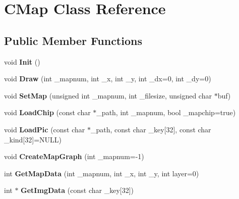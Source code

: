 \hypertarget{class_c_map}{}\section{C\+Map Class Reference}
\label{class_c_map}
\subsection*{Public Member Functions}
\begin{DoxyCompactItemize}
\item 
void {\bfseries Init} ()\hypertarget{class_c_map_a604f597cf8d0f5a5428bceba203f8550}{}\label{class_c_map_a604f597cf8d0f5a5428bceba203f8550}

\item 
void {\bfseries Draw} (int \+\_\+mapnum, int \+\_\+x, int \+\_\+y, int \+\_\+dx=0, int \+\_\+dy=0)\hypertarget{class_c_map_a697a1a7f8c1b05f7d8b54117500ef5de}{}\label{class_c_map_a697a1a7f8c1b05f7d8b54117500ef5de}

\item 
void {\bfseries Set\+Map} (unsigned int \+\_\+mapnum, int \+\_\+filesize, unsigned char $\ast$buf)\hypertarget{class_c_map_aa87f821718e8b827d3f1d4cda73defb8}{}\label{class_c_map_aa87f821718e8b827d3f1d4cda73defb8}

\item 
void {\bfseries Load\+Chip} (const char $\ast$\+\_\+path, int \+\_\+mapnum, bool \+\_\+mapchip=true)\hypertarget{class_c_map_a8eb9c47a12b45ae2b55219d7f8884ee7}{}\label{class_c_map_a8eb9c47a12b45ae2b55219d7f8884ee7}

\item 
void {\bfseries Load\+Pic} (const char $\ast$\+\_\+path, const char \+\_\+key\mbox{[}32\mbox{]}, const char \+\_\+kind\mbox{[}32\mbox{]}=N\+U\+LL)\hypertarget{class_c_map_a02f624d8b14ecf59fe871872262e7e77}{}\label{class_c_map_a02f624d8b14ecf59fe871872262e7e77}

\item 
void {\bfseries Create\+Map\+Graph} (int \+\_\+mapnum=-\/1)\hypertarget{class_c_map_a68f7a6f87f0329e8240f6cb80cc8066d}{}\label{class_c_map_a68f7a6f87f0329e8240f6cb80cc8066d}

\item 
int {\bfseries Get\+Map\+Data} (int \+\_\+mapnum, int \+\_\+x, int \+\_\+y, int layer=0)\hypertarget{class_c_map_a40d05db9c083b83ad7f950b79924641e}{}\label{class_c_map_a40d05db9c083b83ad7f950b79924641e}

\item 
int $\ast$ {\bfseries Get\+Img\+Data} (const char \+\_\+key\mbox{[}32\mbox{]})\hypertarget{class_c_map_a326beaf995b046a34a6a36cc2a260f97}{}\label{class_c_map_a326beaf995b046a34a6a36cc2a260f97}


\end{DoxyCompactItemize}
